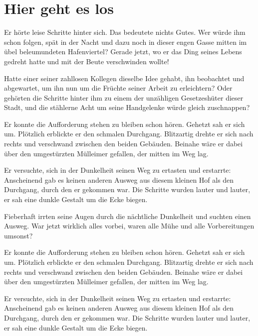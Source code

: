 \documentclass[12pt,ngerman,a4paper,DIV=9,headinclude=true,footinclude=false,titlepage=true,headsepline=true,toc=bibliography,toc=listof]{scrartcl}
\makeatletter
\newif \if@mainmatter \@mainmattertrue
\newcommand*\mainmatter{\clearpage\thispagestyle{plain}\@mainmattertrue\pagenumbering{arabic}}
\makeatother
\begin{document}
{
\hypersetup{linkcolor=black}
\setcounter{tocdepth}{3}
\thispagestyle{plain}
\tableofcontents
}
\listoftables
\listoffigures

\mainmatter
\section{Hier geht es los}\label{hier-geht-es-los}

Er hörte leise Schritte hinter sich. Das bedeutete nichts Gutes. Wer
würde ihm schon folgen, spät in der Nacht und dazu noch in dieser engen
Gasse mitten im übel beleumundeten Hafenviertel? Gerade jetzt, wo er das
Ding seines Lebens gedreht hatte und mit der Beute verschwinden wollte!

Hatte einer seiner zahllosen Kollegen dieselbe Idee gehabt, ihn
beobachtet und abgewartet, um ihn nun um die Früchte seiner Arbeit zu
erleichtern? Oder gehörten die Schritte hinter ihm zu einem der
unzähligen Gesetzeshüter dieser Stadt, und die stählerne Acht um seine
Handgelenke würde gleich zuschnappen?

Er konnte die Aufforderung stehen zu bleiben schon hören. Gehetzt sah er
sich um. Plötzlich erblickte er den schmalen Durchgang. Blitzartig
drehte er sich nach rechts und verschwand zwischen den beiden Gebäuden.
Beinahe wäre er dabei über den umgestürzten Mülleimer gefallen, der
mitten im Weg lag.

Er versuchte, sich in der Dunkelheit seinen Weg zu ertasten und
erstarrte: Anscheinend gab es keinen anderen Ausweg aus diesem kleinen
Hof als den Durchgang, durch den er gekommen war. Die Schritte wurden
lauter und lauter, er sah eine dunkle Gestalt um die Ecke biegen.

Fieberhaft irrten seine Augen durch die nächtliche Dunkelheit und
suchten einen Ausweg. War jetzt wirklich alles vorbei, waren alle Mühe
und alle Vorbereitungen umsonst?

Er konnte die Aufforderung stehen zu bleiben schon hören. Gehetzt sah er
sich um. Plötzlich erblickte er den schmalen Durchgang. Blitzartig
drehte er sich nach rechts und verschwand zwischen den beiden Gebäuden.
Beinahe wäre er dabei über den umgestürzten Mülleimer gefallen, der
mitten im Weg lag.

Er versuchte, sich in der Dunkelheit seinen Weg zu ertasten und
erstarrte: Anscheinend gab es keinen anderen Ausweg aus diesem kleinen
Hof als den Durchgang, durch den er gekommen war. Die Schritte wurden
lauter und lauter, er sah eine dunkle Gestalt um die Ecke biegen.
\end{document}
